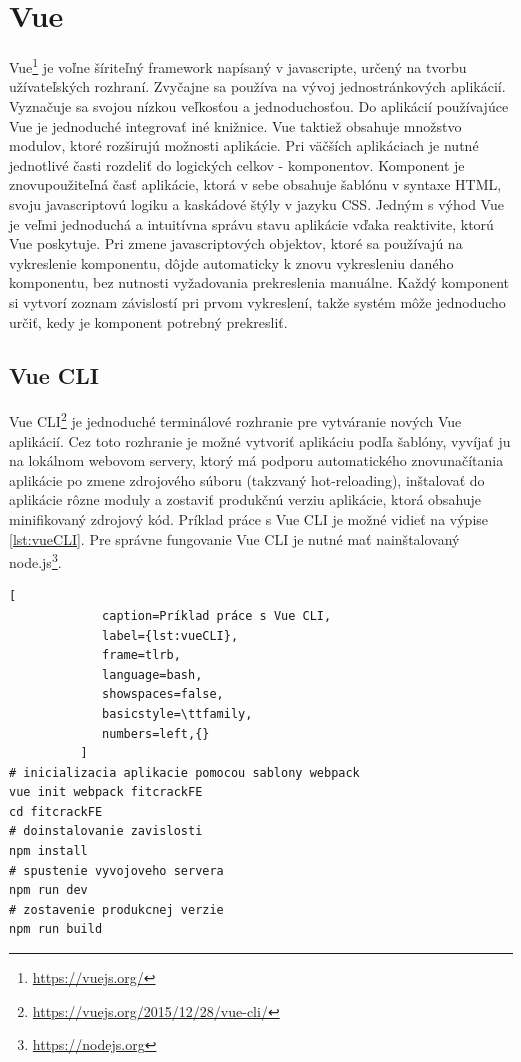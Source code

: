 \documentclass[slovak]{fitthesis}
\begin{document}
\section{Vue}\label{vue}
Vue\footnote{\url{https://vuejs.org/}} je voľne šíriteľný framework napísaný v javascripte, určený na tvorbu užívateľských rozhraní. Zvyčajne sa používa na vývoj jednostránkových aplikácií. Vyznačuje sa svojou nízkou veľkosťou a jednoduchosťou. Do aplikácií používajúce Vue je jednoduché integrovať iné knižnice. Vue taktiež obsahuje množstvo modulov, ktoré rozširujú možnosti aplikácie. Pri väčších aplikáciach je nutné jednotlivé časti rozdeliť do logických celkov - komponentov. Komponent je znovupoužiteľná časť aplikácie, ktorá v sebe obsahuje šablónu v syntaxe HTML, svoju javascriptovú logiku a kaskádové štýly v jazyku CSS. Jedným s výhod Vue je veľmi jednoduchá a intuitívna správu stavu aplikácie vďaka reaktivite, ktorú Vue poskytuje. Pri zmene javascriptových objektov, ktoré sa používajú na vykreslenie komponentu, dôjde automaticky k znovu vykresleniu daného komponentu, bez nutnosti vyžadovania prekreslenia manuálne. Každý komponent si vytvorí zoznam závislostí pri prvom vykreslení, takže systém môže jednoducho určiť, kedy je komponent potrebný prekresliť.

\subsection{Vue CLI}\label{vueCli}
Vue CLI\footnote{\url{https://vuejs.org/2015/12/28/vue-cli/}} je jednoduché terminálové rozhranie pre vytváranie nových Vue aplikácií. Cez toto rozhranie je možné vytvoriť aplikáciu podľa šablóny, vyvíjať ju na lokálnom webovom servery, ktorý má podporu automatického znovunačítania aplikácie po zmene zdrojového súboru (takzvaný hot-reloading), inštalovať do aplikácie rôzne moduly a zostaviť produkčnú verziu aplikácie, ktorá obsahuje minifikovaný zdrojový kód. Príklad práce s Vue CLI je možné vidieť na výpise \ref{lst:vueCLI}. Pre správne fungovanie Vue CLI je nutné mať nainštalovaný node.js\footnote{\url{https://nodejs.org}}.

\begin{lstlisting}[
             caption=Príklad práce s Vue CLI,
             label={lst:vueCLI},
             frame=tlrb,
             language=bash,
             showspaces=false,
             basicstyle=\ttfamily,
             numbers=left,{}
          ]
# inicializacia aplikacie pomocou sablony webpack
vue init webpack fitcrackFE
cd fitcrackFE
# doinstalovanie zavislosti
npm install
# spustenie vyvojoveho servera
npm run dev
# zostavenie produkcnej verzie
npm run build
\end{lstlisting}
\end{document}
